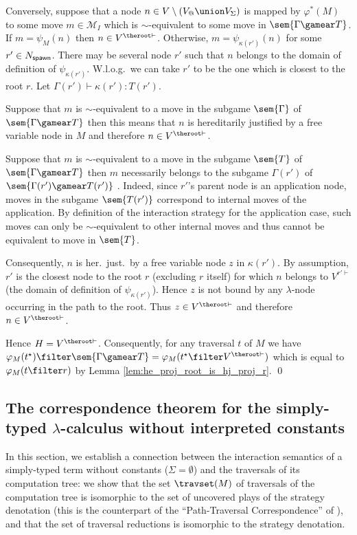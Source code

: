 Conversely, suppose that a node $n \in V\setminus (V_@\union V_\Sigma)$ is mapped by
$\varphi^*(M)$ to some move $m\in \mathcal{M}_I$ which is $\sim$-equivalent
to some move in $\sem{\Gamma \gamear T}$.
 If $m = \psi_M(n)$ then $n\in V^{\theroot\vdash}$. Otherwise,
$m = \psi_{\kappa(r')}(n)$ for some $r' \in N_{\sf spawn}$. There
may be several node $r'$ such that $n$ belongs to the domain of
definition of $\psi_{\kappa(r')}$. W.l.o.g.\ we can take $r'$ to be
the one which is closest to the root $r$. Let $\Gamma(r') \vdash
\kappa(r') : T(r')$.
    \begin{compactitem}
    \item Suppose that $m$ is $\sim$-equivalent to a move in the subgame $\sem{\Gamma}$ of $\sem{\Gamma \gamear T}$
    then this means that $n$ is hereditarily justified by a free variable node in $M$ and therefore $n \in V^{\theroot\vdash}$.

    \item Suppose that $m$ is $\sim$-equivalent to a move in the subgame $\sem{T}$ of $\sem{\Gamma \gamear T}$
    then $m$ necessarily belongs to the subgame $\Gamma(r')$ of $\sem{\Gamma(r')\gamear T(r')}$ .
    Indeed, since $r'$'s parent node is an application node, moves in the subgame
    $\sem{T(r')}$ correspond to internal moves of the application. By definition of
    the interaction strategy for the application case, such moves can only be $\sim$-equivalent to other internal
    moves and thus cannot be equivalent to move in $\sem{T}$.

    Consequently, $n$ is her.\ just.\ by a free variable node $z$ in $\kappa(r')$. By assumption, $r'$ is the closest node to the root $r$ (excluding $r$ itself) for which $n$ belongs to $V^{r'\vdash}$ (the domain of definition of $\psi_{\kappa(r')}$). Hence $z$ is not bound by any $\lambda$-node occurring in the path to the root. Thus $z\in
    V^{\theroot\vdash}$ and therefore $n \in V^{\theroot\vdash}$.
    \end{compactitem}
Hence $H = V^{\theroot\vdash}$. Consequently, for any traversal $t$
of $M$ we have $\varphi_M(t^\star) \filter \sem{\Gamma \gamear T} = \varphi_M(t^\star\filter V^{\theroot\vdash})$ which is equal to
$ \varphi_M(t\filter r)$ by Lemma
\ref{lem:he_proj_root_is_hj_proj_r}. \qed


\subsection{The correspondence theorem for the simply-typed $\lambda$-calculus without interpreted constants}
In this section, we establish a connection between the interaction
semantics of a simply-typed term without constants ($\Sigma =
\emptyset$) and the traversals of its computation tree: we show that
the set $\travset(M)$ of traversals of the computation tree is
isomorphic to the set of uncovered plays of the strategy denotation
(this is the counterpart of the ``Path-Traversal Correspondence'' of
\cite{OngLics2006}), and that the set of traversal reductions is
isomorphic to the strategy denotation.



